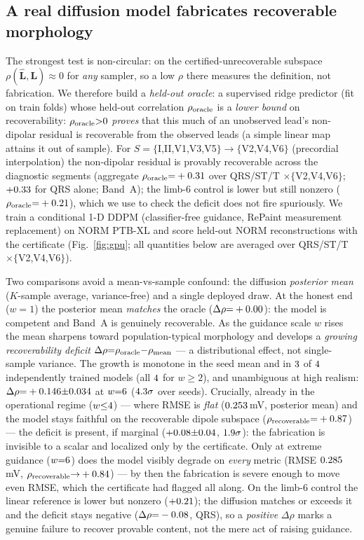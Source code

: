 \subsection{A real diffusion model fabricates recoverable morphology}
The strongest test is non-circular: on the certified-unrecoverable subspace
$\rho(\widehat{\bm L},\bm L)\!\approx\!0$ for \emph{any} sampler, so a low $\rho$ there
measures the definition, not fabrication. We therefore build a \emph{held-out oracle}: a
supervised ridge predictor (fit on train folds) whose held-out correlation
$\rho_{\rm oracle}$ is a \emph{lower bound} on recoverability: $\rho_{\rm oracle}{>}0$
\emph{proves} that this much of an unobserved lead's non-dipolar residual is recoverable
from the observed leads (a simple linear map attains it out of sample). For
$S{=}\{$I,II,V1,V3,V5$\}\!\to\!\{$V2,V4,V6$\}$ (precordial interpolation) the non-dipolar
residual is provably recoverable across the diagnostic segments (aggregate
$\rho_{\rm oracle}{=}+0.31$ over QRS/ST/T $\times\{$V2,V4,V6$\}$; $+0.33$ for QRS
alone; Band~A); the limb-6 control is lower but still nonzero ($\rho_{\rm oracle}{=}
+0.21$), which we use to check the deficit does not fire spuriously. We train a
conditional 1-D DDPM (classifier-free guidance, RePaint measurement replacement) on NORM
PTB-XL and score held-out NORM reconstructions with the certificate (Fig.~\ref{fig:gpu};
all quantities below are averaged over QRS/ST/T $\times\{$V2,V4,V6$\}$).

Two comparisons avoid a mean-vs-sample confound: the diffusion \emph{posterior mean}
($K$-sample average, variance-free) and a single deployed draw. At the honest end
($w{=}1$) the posterior mean \emph{matches} the oracle ($\Delta\rho{=}+0.00$): the
model is competent and Band~A is genuinely recoverable. As the guidance scale $w$ rises
the mean sharpens toward population-typical morphology and develops a \emph{growing
recoverability deficit} $\Delta\rho{=}\rho_{\rm oracle}{-}\rho_{\rm mean}$ --- a
distributional effect, not single-sample variance. The growth is monotone in the seed
mean and in $3$ of $4$ independently trained models (all $4$ for
$w{\ge}2$), and unambiguous at high realism: $\Delta\rho{=}+0.146{\pm}0.034$ at
$w{=}6$ ($4.3\sigma$ over seeds). Crucially, already in the operational
regime ($w{\le}4$) --- where RMSE is \emph{flat} ($0.253$\,mV, posterior mean)
and the model stays faithful on the recoverable dipole subspace
($\rho_{\rm recoverable}{=}+0.87$) --- the deficit is present, if marginal
($+0.08{\pm}0.04$, $1.9\sigma$): the fabrication is invisible to
a scalar and localized only by the certificate. Only at extreme guidance ($w{=}6$)
does the model visibly degrade on \emph{every} metric (RMSE $0.285$\,mV,
$\rho_{\rm recoverable}{\to}+0.84$) --- by then the fabrication is severe enough to move
even RMSE, which the certificate had flagged all along. On the limb-6 control the linear reference is lower but nonzero ($+0.21$); the
diffusion matches or exceeds it and the deficit stays negative ($\Delta\rho{=}-0.08$,
QRS), so a \emph{positive} $\Delta\rho$ marks a genuine failure to recover provable
content, not the mere act of raising guidance.

